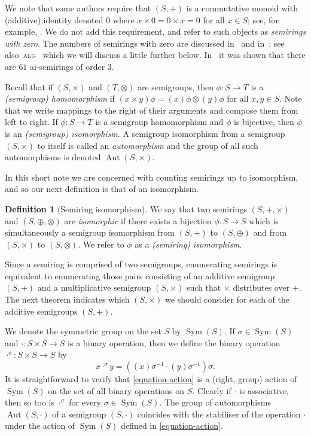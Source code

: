 \documentclass{article}
\theoremstyle{definition}
\newtheorem{defn}{Definition}[section]
\theoremstyle{plain}
\newcommand{\alg}{\textsc{alg}~\cite{baueralg}\xspace}
\newcommand{\Sym}{\operatorname{Sym}}
\newcommand{\Aut}{\operatorname{Aut}}
\begin{document}
We note that some authors require that $(S, +)$ is a commutative monoid with
(additive) identity denoted $0$ where $x\times 0 = 0 \times x = 0$ for all
$x\in S$; see, for example, \cite{Lothaire2005, Sakarovitch2009}. We do not add
this requirement, and refer to such objects as \textit{semirings with zero}.
The numbers of semirings with zero are discussed in~\cite{stackexchange} and
in~\cite{jipsen}; see also~\alg which we will discuss a little
further below. In~\cite{Zhao2020} it was shown that there are $61$ ai-semirings
of order $3$.

Recall that if $(S, \times)$ and $(T, \otimes)$ are semigroups, then $\phi:S
\to T$ is a \textit{(semigroup) homomorphism} if $(x\times y)\phi =
(x)\phi\otimes (y)\phi$ for all $x, y\in S$. Note that we write mappings to the
right of their arguments and compose them from left to right. If $\phi: S \to
T$ is a semigroup homomorphism and $\phi$ is bijective, then $\phi$ is an
\textit{(semigroup) isomorphism}. A semigroup isomorphism from a semigroup
$(S, \times)$ to itself is called an \textit{automorphism}
and the group of all such automorphisms is denoted $\Aut(S, \times)$.

In this short note we are concerned with counting semirings up to isomorphism,
and so our next definition is that of an isomorphism.

\begin{defn}[Semiring isomorphism]\label{defn-semiring-iso}
  We say that two semirings \((S,+,\times)\) and \((S, \oplus, \otimes)\) are
  \emph{isomorphic} if there exists a bijection \(\phi: S \to S\) which is
  simultaneously a semigroup isomorphism from $(S, +)$ to $(S, \oplus)$ and
  from $(S, \times)$ to $(S, \otimes)$. We refer to $\phi$ as a
  \textit{(semiring) isomorphism}.
\end{defn}

Since a semiring is comprised of two semigroups, enumerating semirings is
equivalent to enumerating those pairs consisting of an additive semigroup $(S,
+)$ and a multiplicative semigroup $(S, \times)$ such that $\times$ distributes
over $+$. The next theorem indicates which $(S, \times)$ we should consider
for each of the additive semigroups $(S, +)$.

We denote the symmetric group on the set $S$ by $\Sym(S)$. If $\sigma\in
\Sym(S)$ and $\cdot: S \times S \to S$ is a binary operation, then we define
the binary operation $\cdot ^ \sigma: S\times S \to S$ by
\begin{equation}\label{equation-action}
  x \cdot ^ \sigma y = ((x)\sigma^{-1} \cdot (y)\sigma ^ {-1})\sigma.
\end{equation}
It is straightforward to verify that \eqref{equation-action} is a (right, group)
action of $\Sym(S)$ on the set of all binary operations on $S$. Clearly if
$\cdot$ is associative, then so too is $\cdot ^ \sigma$ for every $\sigma \in
\Sym(S)$. The group of automorphisms $\Aut(S,\cdot)$ of a
semigroup $(S, \cdot)$ coincides with the stabiliser of the operation $\cdot$
under the action of $\Sym(S)$ defined in \eqref{equation-action}.
\end{document}
